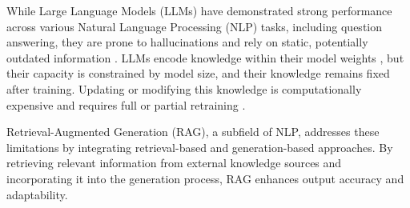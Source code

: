 While Large Language Models (LLMs) have demonstrated strong performance across various Natural Language Processing (NLP) tasks, including question answering, they are prone to hallucinations and rely on static, potentially outdated information \cite{Marcus2020TheND}.
LLMs encode knowledge within their model weights \cite{petroni-etal-2019-language}, but their capacity is constrained by model size, and their knowledge remains fixed after training. Updating or modifying this knowledge is computationally expensive and requires full or partial retraining \cite{realm}.

Retrieval-Augmented Generation (RAG), a subfield of NLP, addresses these limitations by integrating retrieval-based and generation-based approaches.
By retrieving relevant information from external knowledge sources and incorporating it into the generation process, RAG enhances output accuracy and adaptability.